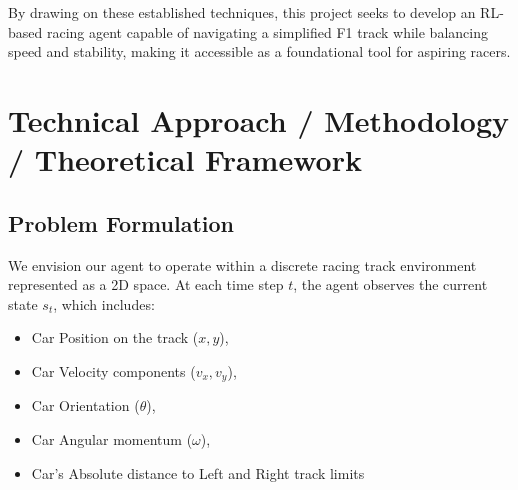 \documentclass{article}
\begin{document}

By drawing on these established techniques, this project seeks to develop an RL-based racing agent capable of navigating a simplified F1 track while balancing speed and stability, making it accessible as a foundational tool for aspiring racers.


\section{Technical Approach / Methodology / Theoretical Framework}


\subsection{Problem Formulation}

We envision our agent to operate within a discrete racing track environment represented as a 2D space.
At each time step \(t\), the agent observes the current state \(s_t\), which includes:
\begin{itemize}
	\item Car Position on the track (\(x, y\)),
	\item Car Velocity components (\(v_x, v_y\)),
	\item Car Orientation (\(\theta\)),
	\item Car Angular momentum (\(\omega\)),
	\item Car's Absolute distance to Left and Right track limits
\end{itemize}
\end{document}
